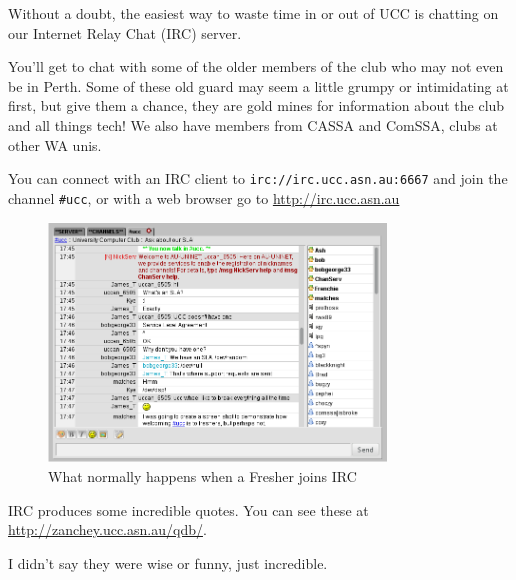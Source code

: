 \begin{mdframed}
Without a doubt, the easiest way to waste time in or out of UCC 
is chatting on our Internet Relay Chat (IRC) server. 

You'll get to chat with some of the older members of the club who 
may not even be in Perth. Some of these old guard may seem a 
little grumpy or intimidating at first, but give them a chance, they 
are gold mines for information about the club and all things tech! 
We also have members from CASSA and ComSSA, clubs at other WA unis. 

You can connect with an IRC client to \texttt{irc://irc.ucc.asn.au:6667} 
and join the channel \texttt{\#ucc}, or with a web browser go to 
\url{http://irc.ucc.asn.au}

\begin{figure}[H]
	\centering
	\includegraphics[width=0.8\textwidth]{figures/webirc.png}
	\caption{What normally happens when a Fresher joins IRC}
	\label{webirc.jpg}
\end{figure}

IRC produces some incredible quotes. You can see these at \url{http://zanchey.ucc.asn.au/qdb/}.

I didn't say they were wise or funny, just incredible.

\end{mdframed}


